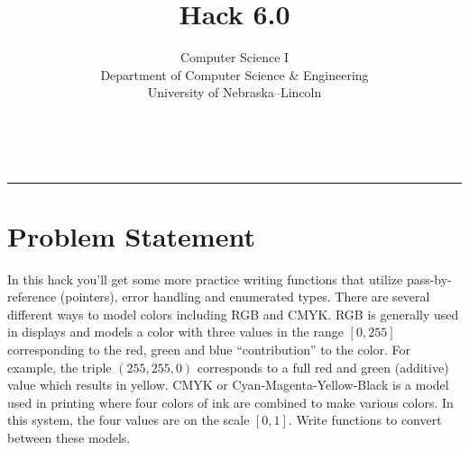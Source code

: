 \documentclass[12pt]{scrartcl}
\title{Hack 6.0}\let\Title\@title
\subtitle{Computer Science I\\
{\small
\vskip1cm
Department of Computer Science \& Engineering \\
University of Nebraska--Lincoln}
\vskip-1cm}
\date{~}
\begin{document}
\maketitle

\hrule



\section*{Problem Statement}

In this hack you'll get some more practice writing functions that utilize 
pass-by-reference (pointers), error handling and enumerated types.  There 
are several different
ways to model colors including RGB and CMYK.  RGB is generally used in displays
and models a color with three values in the range $[0, 255]$ corresponding to 
the red, green and blue ``contribution'' to the color.  For example, the
triple $(255, 255, 0)$ corresponds to a full red and green (additive) value
which results in yellow.  CMYK or Cyan-Magenta-Yellow-Black is a model used
in printing where four colors of ink are combined to make various colors.
In this system, the four values are on the scale $[0, 1]$.  Write 
functions to convert between these models.
\end{document}
